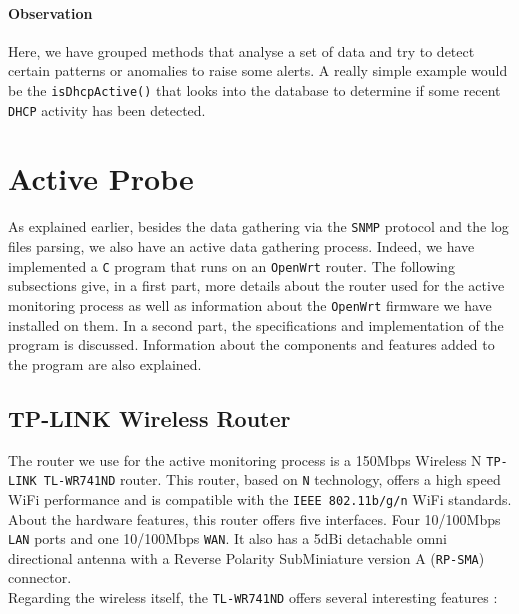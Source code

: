 \paragraph*{Observation} Here, we have grouped methods that analyse a set of data and try to detect certain patterns or anomalies to raise some alerts. A really simple example would be the \texttt{isDhcpActive()} that looks into the database to determine if some recent \texttt{DHCP} activity has been detected.


\section{Active Probe}
As explained earlier, besides the data gathering via the \texttt{SNMP} protocol and the log files parsing, we also have an active data gathering process. Indeed, we have implemented a \texttt{C} program that runs on an \texttt{OpenWrt} router. The following subsections give, in a first part, more details about the router used for the active monitoring process as well as information about the \texttt{OpenWrt} firmware we have installed on them. In a second part, the specifications and implementation of the program is discussed. Information about the components and features added to the program are also explained.\\


\subsection{TP-LINK Wireless Router}
The router we use for the active monitoring process is a 150Mbps Wireless N \texttt{TP-LINK TL-WR741ND} router. This router, based on \texttt{N} technology, offers a high speed WiFi performance and is compatible with the \texttt{IEEE 802.11b/g/n} WiFi standards. \\
About the hardware features, this router offers five interfaces. Four 10/100Mbps \texttt{LAN} ports and one 10/100Mbps \texttt{WAN}. It also has a 5dBi detachable omni directional antenna with a Reverse Polarity SubMiniature version A (\texttt{RP-SMA}) connector.\\
Regarding the wireless itself, the \texttt{TL-WR741ND} offers several interesting features \cite{tplink}:

